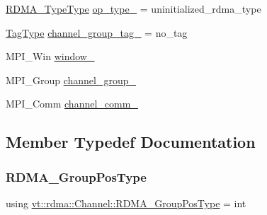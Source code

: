 \begin{DoxyCompactItemize}
\item 
\hyperlink{namespacevt_1_1rdma_ac848e1d9da43db6294bd06f83e5d3946}{R\+D\+M\+A\+\_\+\+Type\+Type} \hyperlink{structvt_1_1rdma_1_1_channel_a4f5a71eff9513362a9413d5bd88a4308}{op\+\_\+type\+\_\+} = uninitialized\+\_\+rdma\+\_\+type
\item 
\hyperlink{namespacevt_a84ab281dae04a52a4b243d6bf62d0e52}{Tag\+Type} \hyperlink{structvt_1_1rdma_1_1_channel_a23d0c5d64266cb4dd19eb3e4539d24f0}{channel\+\_\+group\+\_\+tag\+\_\+} = no\+\_\+tag
\item 
M\+P\+I\+\_\+\+Win \hyperlink{structvt_1_1rdma_1_1_channel_aaecfddf4b74d52f4924d228ec46bcf59}{window\+\_\+}
\item 
M\+P\+I\+\_\+\+Group \hyperlink{structvt_1_1rdma_1_1_channel_af4a0e2ef3352ae60e61601d65e120ab9}{channel\+\_\+group\+\_\+}
\item 
M\+P\+I\+\_\+\+Comm \hyperlink{structvt_1_1rdma_1_1_channel_aded72d4b1d8e8ed23b4e384b96b99c67}{channel\+\_\+comm\+\_\+}
\end{DoxyCompactItemize}


\subsection{Member Typedef Documentation}
\mbox{\label{structvt_1_1rdma_1_1_channel_ae67759ab26cc035489edd369ae207cfc}} 
\subsubsection{\texorpdfstring{R\+D\+M\+A\+\_\+\+Group\+Pos\+Type}{RDMA\_GroupPosType}}
{\footnotesize\ttfamily using \hyperlink{structvt_1_1rdma_1_1_channel_ae67759ab26cc035489edd369ae207cfc}{vt\+::rdma\+::\+Channel\+::\+R\+D\+M\+A\+\_\+\+Group\+Pos\+Type} =  int}

\mbox{\label{structvt_1_1rdma_1_1_channel_ad558d07a917519f3e713fc41496a5ef7}} 

